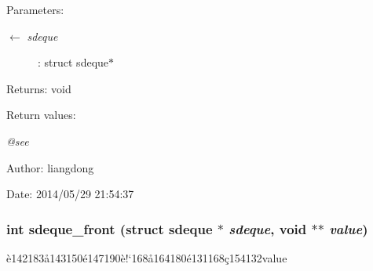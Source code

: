 \begin{Desc}
\item[Parameters:]
\begin{description}
\item[\mbox{$\leftarrow$} {\em sdeque}]: struct sdeque$\ast$ \end{description}
\end{Desc}
\begin{Desc}
\item[Returns:]void \end{Desc}
\begin{Desc}
\item[Return values:]
\begin{description}
\item[{\em @see}]\end{description}
\end{Desc}
\begin{Desc}
\item[Author:]liangdong \end{Desc}
\begin{Desc}
\item[Date:]2014/05/29 21:54:37 \end{Desc}
\subsubsection{\setlength{\rightskip}{0pt plus 5cm}int sdeque\_\-front (struct sdeque $\ast$ {\em sdeque}, void $\ast$$\ast$ {\em value})}\label{sdeque_8h_a4}


\`{e}142183\aa{}143150\'{e}147190\`{e}!`168\aa{}164180\'{e}131168\c{c}154132value 

